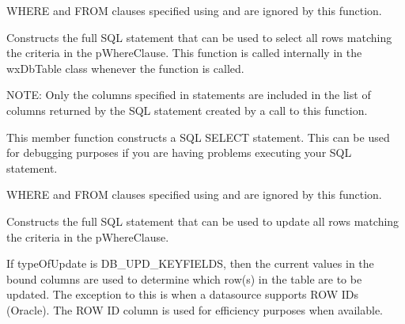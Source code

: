 WHERE and FROM clauses specified using 
and  are ignored by
this function.

\label{wxdbtablebuildselectstmt}


Constructs the full SQL statement that can be used to select all rows matching
the criteria in the pWhereClause.  This function is called internally in the
wxDbTable class whenever the function 
is called.

NOTE: Only the columns specified in 
statements are included in the list of columns returned by the SQL statement
created by a call to this function.




This member function constructs a SQL SELECT statement.  This can be used for
debugging purposes if you are having problems executing your SQL statement.

WHERE and FROM clauses specified using
and  are ignored by
this function.

\label{wxdbtablebuildupdatestmt}


Constructs the full SQL statement that can be used to update all rows matching
the criteria in the pWhereClause.

If typeOfUpdate is DB\_UPD\_KEYFIELDS, then the current values in the bound columns
are used to determine which row(s) in the table are to be updated. The
exception to this is when a datasource supports ROW IDs (Oracle).  The ROW ID
column is used for efficiency purposes when available.

